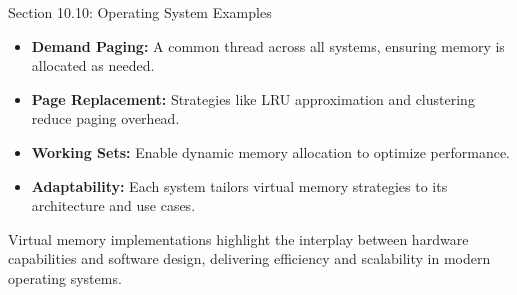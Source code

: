 \begin{notes}{Section 10.10: Operating System Examples}
    \begin{highlight}
    
    \begin{itemize}
        \item \textbf{Demand Paging:} A common thread across all systems, ensuring memory is allocated as needed.
        \item \textbf{Page Replacement:} Strategies like LRU approximation and clustering reduce paging overhead.
        \item \textbf{Working Sets:} Enable dynamic memory allocation to optimize performance.
        \item \textbf{Adaptability:} Each system tailors virtual memory strategies to its architecture and use cases.
    \end{itemize}
    
    Virtual memory implementations highlight the interplay between hardware capabilities and software design, delivering efficiency and scalability in modern operating systems.
    
    \end{highlight}
\end{notes}
